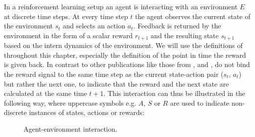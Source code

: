 In a reinforcement learning setup an agent is interacting with an environment $E$ at discrete time steps. At every time step $t$ the agent observes the current state of the environment $s_t$ and selects an action $a_t$. Feedback is returned by the environment in the form of a scalar reward $r_{t+1}$ and the resulting state $s_{t+1}$ based on the intern dynamics of the environment. We will use the definitions of \cite{Sutton1998} throughout this chapter, especially the definition of the point in time the reward is given back. In contrast to other publications like those from \cite{zare2021continuous}, \cite{wiering2012reinforcement} and \cite{lillicrap2019continuous}, \cite{Sutton1998} do not bind the reward signal to the same time step as the current state-action pair ($s_t$, $a_t$) but rather the next one, to indicate that the reward and the next state are calculated at the same time $t+1$.
This interaction can thus be illustrated in the following way, where uppercase symbols e.g. $A$, $S$ or $R$ are used to indicate non-discrete instances of states, actions or rewards:
\begin{figure}[H]
    \centering
    \hspace*{1cm}%
    \caption{Agent-environment interaction.}
    \label{fig:rlEnvironment}
\end{figure}



